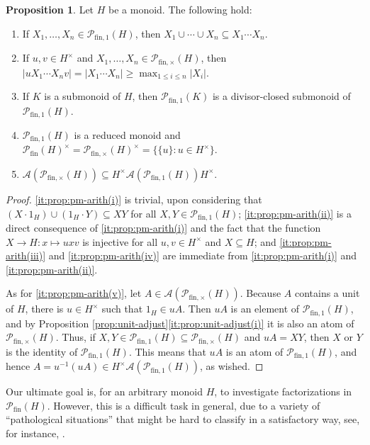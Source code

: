 \documentclass{report}
\renewcommand{\P}{\mathcal{P}}
\newcommand{\fin}{\textrm{fin}}
\newcommand{\funt}{{\textrm{fin}, \times}}
\newcommand{\fun}{{\textrm{fin}, 1}}
\renewcommand{\:}{\text{:}}
\theoremstyle{definition}
\newtheorem{prop}[defn]{Proposition}
\begin{document}
\begin{prop}\label{prop:pm-arith}
	Let $H$ be a monoid. The following hold:
	\begin{enumerate}[label={\rm (\roman{*})}]
		\item\label{it:prop:pm-arith(i)} If $X_1,\ldots,X_n\in \P_{\fin,1}(H)$, then $X_1 \cup \cdots \cup X_n \subseteq X_1 \cdots X_n$.
		\item\label{it:prop:pm-arith(ii)} If $u,v \in H^\times$ and $X_1,\ldots,X_n\in \P_{\fin,\times}(H)$, then $|uX_1 \cdots X_nv| = |X_1 \cdots X_n| \ge \max_{1 \le i \le n} |X_i|$.
		\item\label{it:prop:pm-arith(iii)} If $K$ is a submonoid of $H$, then $\P_\fun(K)$ is a divisor-closed submonoid of $\P_\fun(H)$.
		\item \label{it:prop:pm-arith(iv)} $\P_\fun(H)$ is a reduced monoid and $\P_\fin(H)^\times=\P_\funt(H)^\times = \bigl\{ \{u\}: u\in H^\times\bigr\}$.
		\item \label{it:prop:pm-arith(v)} $\mathscr{A}(\mathcal P_{\funt}(H)) \subseteq H^\times \mathscr{A}(\mathcal P_{\fun}(H)) H^\times$.
	\end{enumerate}
\end{prop}
%
\begin{proof}
	\ref{it:prop:pm-arith(i)} is trivial, upon considering that $(X \cdot 1_H) \cup (1_H \cdot Y) \subseteq XY$ for all $X, Y \in \mathcal P_\fun(H)$; \ref{it:prop:pm-arith(ii)} is a direct consequence of \ref{it:prop:pm-arith(i)} and the fact that the function $X \to H: x \mapsto uxv$ is injective for all $u, v \in H^\times$ and $X \subseteq H$; and \ref{it:prop:pm-arith(iii)} and \ref{it:prop:pm-arith(iv)} are immediate from \ref{it:prop:pm-arith(i)} and \ref{it:prop:pm-arith(ii)}.
	
	As for \ref{it:prop:pm-arith(v)}, let $A\in \mathscr{A}(\P_\funt(H))$.
	Because $A$ contains a unit of $H$, there is $u\in H^\times$ such that $1_H \in uA$.
	Then $uA$ is an element of $\P_\fun(H)$, and by Proposition \ref{prop:unit-adjust}\ref{it:prop:unit-adjust(i)} it is also an atom of $\P_\funt(H)$.
	Thus, if $X,Y\in \P_\fun(H) \subseteq \P_\funt(H)$ and $uA = XY$, then $X$ or $Y$ is the identity of $\P_\fun(H)$.
	This means that $uA$ is an atom of $\P_\fun(H)$, and hence $A=u^{-1}(uA)\in H^\times \mathscr{A}(\P_\fun(H))$, as wished.
\end{proof}
%
%
Our ultimate goal is, for an arbitrary monoid $H$, to investigate factorizations in $\P_\fin(H)$. However, this is a difficult task in general, due to a variety of ``pathological situations'' that might be hard to classify in a satisfactory way, see, for instance, \cite[Remark 3.3(ii)]{fan-tringali18}.
\end{document}
